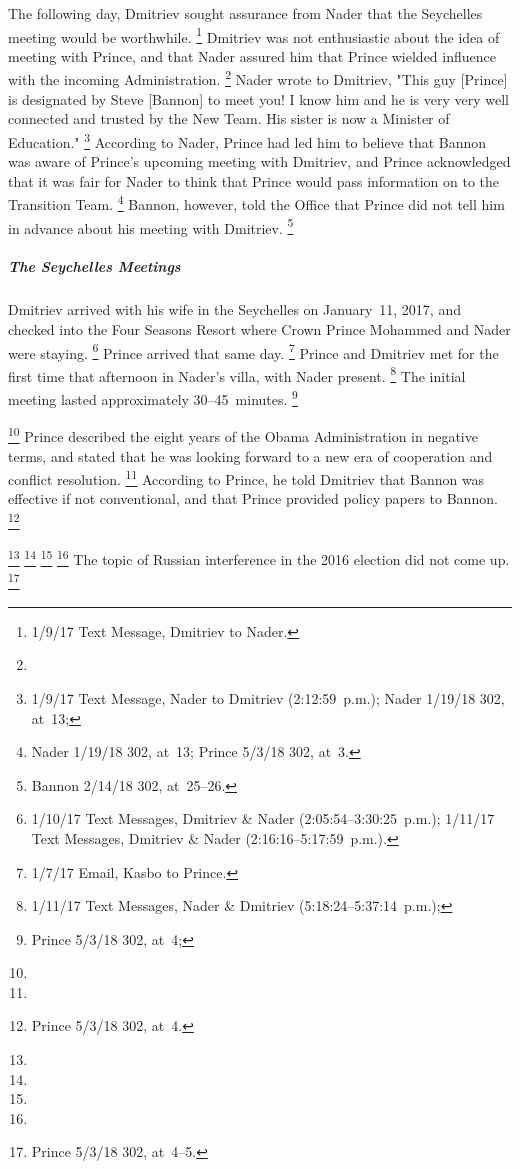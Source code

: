The following day, Dmitriev sought assurance from Nader that the Seychelles meeting would be worthwhile.%
\footnote{1/9/17 Text Message, Dmitriev to Nader.}
Dmitriev was not enthusiastic about the idea of meeting with Prince, and that Nader assured him that Prince wielded influence with the incoming Administration.%
\footnote{}
Nader wrote to Dmitriev, "This guy [Prince] is designated by Steve [Bannon] to meet you!
I know him and he is very very well connected and trusted by the New Team.
His sister is now a Minister of Education."%
\footnote{1/9/17 Text Message, Nader to Dmitriev (2:12:59~p.m.);
Nader 1/19/18 302, at~13;
}
According to Nader, Prince had led him to believe that Bannon was aware of Prince's upcoming meeting with Dmitriev, and Prince acknowledged that it was fair for Nader to think that Prince would pass information on to the Transition Team.%
\footnote{Nader 1/19/18 302, at~13;  Prince 5/3/18 302, at~3.}
Bannon, however, told the Office that Prince did not tell him in advance about his meeting with Dmitriev.%
\footnote{Bannon 2/14/18 302, at~25--26.}

\subparagraph{The Seychelles Meetings}

Dmitriev arrived with his wife in the Seychelles on January~11, 2017, and checked into the Four Seasons Resort where Crown Prince Mohammed and Nader were staying.%
\footnote{1/10/17 Text Messages, Dmitriev \& Nader (2:05:54--3:30:25~p.m.);
1/11/17 Text Messages, Dmitriev \& Nader (2:16:16--5:17:59~p.m.).}
Prince arrived that same day.%
\footnote{1/7/17 Email, Kasbo to Prince.}
Prince and Dmitriev met for the first time that afternoon in Nader's villa, with Nader present.%
\footnote{1/11/17 Text Messages, Nader \& Dmitriev (5:18:24--5:37:14~p.m.);
}
The initial meeting lasted approximately 30--45~minutes.%
\footnote{Prince 5/3/18 302, at~4; }

\footnote{}
Prince described the eight years of the Obama Administration in negative terms, and stated that he was looking forward to a new era of cooperation and conflict resolution.%
\footnote{}
According to Prince, he told Dmitriev that Bannon was effective if not conventional, and that Prince provided policy papers to Bannon.%
\footnote{Prince 5/3/18 302, at~4.}

\footnote{}
\footnote{}
\footnote{}
\footnote{}
The topic of Russian interference in the 2016 election did not come up.%
\footnote{Prince 5/3/18 302, at~4--5.}

